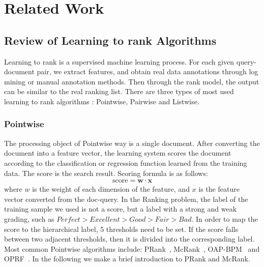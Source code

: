 \chapter{Related Work}\label{ch:Related Work}
\section{Review of Learning to rank Algorithms}\label{ch:Related Work1}
Learning to rank is a supervised machine learning process. For each given query-document pair, we extract features, and obtain real data annotations through log mining or manual annotation methods. Then through the rank model, the output can be similar to the real ranking list. There are three types of most used learning to rank algorithms : Pointwise, Pairwise and Listwise.
\subsection{Pointwise}
The processing object of Pointwise way is a single document. After converting the document into a feature vector, the learning system scores the document according to the classification or regression function learned from the training data. The score is the search result. Scoring formula is as follows:
\begin{equation}
\begin{aligned}
\mathrm{score} =  \mathbf w \cdot \mathbf x
\end{aligned}
\label{eqn:eq1}
\end{equation}
where  $ w $ is the weight of each dimension of the feature, and $ x $ is the feature vector converted from the doc-query. In the Ranking problem, the label of the training sample we used is not a score, but a label with a strong and weak grading, such as $Perfect> Excellent> Good> Fair> Bad$. In order to map the score to the hierarchical label, 5 thresholds need to be set. If the score falls between two adjacent thresholds, then it is divided into the corresponding label. Most common Pointwise algorithms include: PRank~\cite{crammer2002pranking}, McRank~\cite{Li:2007:MLR:2981562.2981675}, OAP-BPM~\cite{harrington2003online} and 
OPRF~\cite{Fuhr:1989:OPR:65943.65944}. In the following we make a brief introduction to PRank and McRank.

